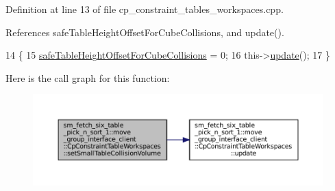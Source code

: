Definition at line 13 of file cp\+\_\+constraint\+\_\+tables\+\_\+workspaces.\+cpp.



References safe\+Table\+Height\+Offset\+For\+Cube\+Collisions, and update().


\begin{DoxyCode}
14         \{
15             \hyperlink{classsm__fetch__six__table__pick__n__sort__1_1_1move__group__interface__client_1_1CpConstraintTableWorkspaces_a3fb4f4deb8a694ff797af6336e74444e}{safeTableHeightOffsetForCubeCollisions} = 0;
16             this->\hyperlink{classsm__fetch__six__table__pick__n__sort__1_1_1move__group__interface__client_1_1CpConstraintTableWorkspaces_a2588601a0f45af921e1864f8ba765c51}{update}();
17         \}
\end{DoxyCode}
Here is the call graph for this function\+:
\nopagebreak
\begin{figure}[H]
\begin{center}
\leavevmode
\includegraphics[width=350pt]{classsm__fetch__six__table__pick__n__sort__1_1_1move__group__interface__client_1_1CpConstraintTableWorkspaces_a65cb88bd556ced33b106e8f5dd4ce2f3_cgraph}
\end{center}
\end{figure}
\mbox{\label{classsm__fetch__six__table__pick__n__sort__1_1_1move__group__interface__client_1_1CpConstraintTableWorkspaces_a2588601a0f45af921e1864f8ba765c51}} 
